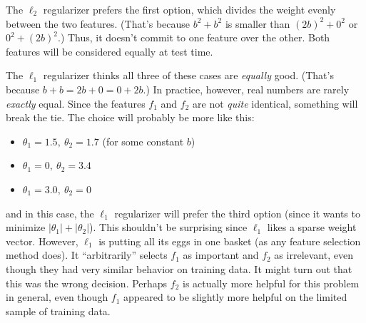 \documentclass[11pt]{article}
\begin{document}
The $\ell_2$ regularizer prefers the first option, which divides the weight evenly between the two features.  (That's because $b^2+b^2$ is smaller than $(2b)^2+0^2$ or $0^2+(2b)^2$.)  Thus, it doesn't commit to one feature over the other.  Both features will be considered equally at test time.

The $\ell_1$ regularizer thinks all three of these cases are {\em equally} good.  (That's because $b+b = 2b+0 = 0+2b$.)  In practice, however, real numbers are rarely {\em exactly} equal.  Since the features $f_1$ and $f_2$ are not {\em quite} identical, something will break the tie.  The choice will probably be more like this:
\begin{itemize}[noitemsep]
\item $\theta_1=1.5,\ \theta_2=1.7$  (for some constant $b$)
\item $\theta_1=0,\ \theta_2=3.4$
\item $\theta_1=3.0,\ \theta_2=0$
\end{itemize}
and in this case, the $\ell_1$ regularizer will prefer the third option (since it wants to minimize $|\theta_1|+|\theta_2|$).  This shouldn't be surprising since $\ell_1$ likes a sparse weight vector.  However, $\ell_1$ is putting all its eggs in one basket (as any feature selection method does).  It ``arbitrarily'' selects $f_1$ as important and $f_2$ as irrelevant, even though they had very similar behavior on training data.  It might turn out that this was the wrong decision.  Perhaps $f_2$ is actually more helpful for this problem in general, even though $f_1$ appeared to be slightly more helpful on the limited sample of training data.
\end{document}
